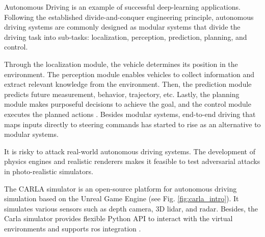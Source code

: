 

Autonomous Driving is an example of successful deep-learning applications. Following the established divide-and-conquer engineering principle, autonomous driving systems are commonly designed as modular systems that divide the driving task into sub-tasks: localization, perception, prediction, planning, and control. 

Through the localization module, the vehicle determines its position in the environment. The perception module enables vehicles to collect information and extract relevant knowledge from the environment. Then, the prediction module predicts future measurement, behavior, trajectory, etc. Lastly, the planning module makes purposeful decisions to achieve the goal, and the control module executes the planned actions \citep{pendleton2017perception}. Besides modular systems, end-to-end driving that maps inputs directly to steering commands has started to rise as an alternative to modular systems.

It is risky to attack real-world autonomous driving systems. The development of physics engines and realistic renderers makes it feasible to test adversarial attacks in photo-realistic simulators.
 

The CARLA simulator is an open-source platform for autonomous driving simulation based on the Unreal Game Engine (see Fig. \ref{fig:carla_intro}). It simulates various sensors such as depth camera, 3D lidar, and radar. Besides, the Carla simulator provides flexible Python API to interact with the virtual environments and supports \acrfull{ros} integration \citep{Dosovitskiy17}.

